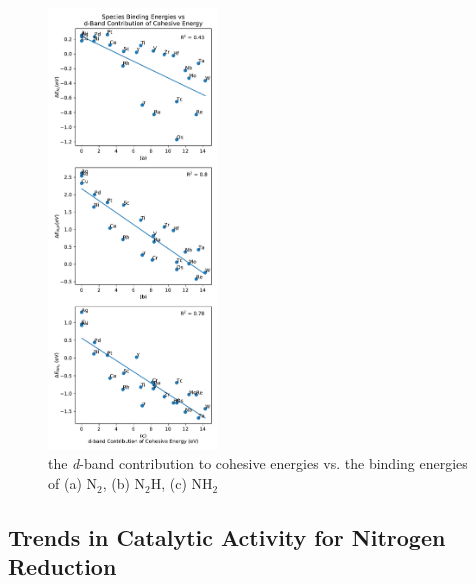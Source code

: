 \begin{figure}
    \centering
    \includegraphics[width=0.4\textwidth]{Images/species_cohesive.pdf}
    \caption{the \textit{d}-band contribution to cohesive energies vs. the binding energies of (a) N$_2$, (b) N$_2$H, (c) NH$_2$}
    \label{fig:my_label}
\end{figure}
\subsection{Trends in Catalytic Activity for Nitrogen Reduction}

